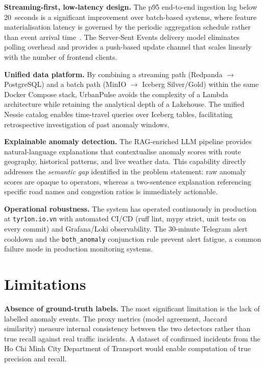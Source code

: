 \textbf{Streaming-first, low-latency design.}
The p95 end-to-end ingestion lag below 20~seconds is a significant improvement
over batch-based systems, where feature materialisation latency is governed by
the periodic aggregation schedule rather than event arrival
time~\cite{batch_latency_survey}. The Server-Sent Events delivery
model eliminates polling overhead and provides a push-based update channel
that scales linearly with the number of frontend clients.

\textbf{Unified data platform.}
By combining a streaming path (Redpanda $\to$ PostgreSQL) and a batch path
(MinIO $\to$ Iceberg Silver/Gold) within the same Docker Compose stack,
UrbanPulse avoids the complexity of a Lambda architecture while retaining
the analytical depth of a Lakehouse. The unified Nessie catalog enables
time-travel queries over Iceberg tables, facilitating retrospective
investigation of past anomaly windows.

\textbf{Explainable anomaly detection.}
The RAG-enriched LLM pipeline provides natural-language explanations that
contextualise anomaly scores with route geography, historical patterns, and
live weather data. This capability directly addresses the \textit{semantic
gap} identified in the problem statement: raw anomaly scores are opaque to
operators, whereas a two-sentence explanation referencing specific road names
and congestion ratios is immediately actionable.

\textbf{Operational robustness.}
The system has operated continuously in production at
\texttt{tyr1on.io.vn} with automated CI/CD (ruff lint, mypy strict, unit
tests on every commit) and Grafana/Loki observability. The 30-minute
Telegram alert cooldown and the \texttt{both\_anomaly} conjunction rule
prevent alert fatigue, a common failure mode in production monitoring systems.

\section{Limitations}
\label{sec:limitations}

\textbf{Absence of ground-truth labels.}
The most significant limitation is the lack of labelled anomaly events. The
proxy metrics (model agreement, Jaccard similarity) measure internal
consistency between the two detectors rather than true recall against real
traffic incidents. A dataset of confirmed incidents from the Ho Chi Minh City
Department of Transport would enable computation of true precision and recall.

